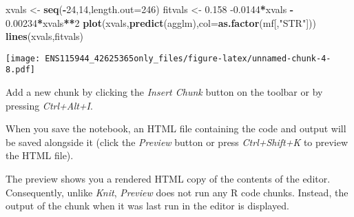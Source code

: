 \documentclass[
]{article}
\newenvironment{Shaded}{\begin{snugshade}}{\end{snugshade}}
\newcommand{\DataTypeTok}[1]{\textcolor[rgb]{0.13,0.29,0.53}{#1}}
\newcommand{\DecValTok}[1]{\textcolor[rgb]{0.00,0.00,0.81}{#1}}
\newcommand{\FloatTok}[1]{\textcolor[rgb]{0.00,0.00,0.81}{#1}}
\newcommand{\KeywordTok}[1]{\textcolor[rgb]{0.13,0.29,0.53}{\textbf{#1}}}
\newcommand{\NormalTok}[1]{#1}
\newcommand{\OperatorTok}[1]{\textcolor[rgb]{0.81,0.36,0.00}{\textbf{#1}}}
\newcommand{\StringTok}[1]{\textcolor[rgb]{0.31,0.60,0.02}{#1}}
\begin{document}
\begin{Shaded}
\begin{Highlighting}[]
\NormalTok{xvals <-}\StringTok{ }\KeywordTok{seq}\NormalTok{(}\OperatorTok{-}\DecValTok{24}\NormalTok{,}\DecValTok{14}\NormalTok{,}\DataTypeTok{length.out=}\DecValTok{246}\NormalTok{)}
\NormalTok{fitvals <-}\StringTok{ }\FloatTok{0.158} \FloatTok{-0.0144}\OperatorTok{*}\NormalTok{xvals }\OperatorTok{-}\StringTok{ }\FloatTok{0.00234}\OperatorTok{*}\NormalTok{xvals}\OperatorTok{**}\DecValTok{2}
\KeywordTok{plot}\NormalTok{(xvals,}\KeywordTok{predict}\NormalTok{(agglm),}\DataTypeTok{col=}\KeywordTok{as.factor}\NormalTok{(mf[,}\StringTok{"STR"}\NormalTok{]))}
\KeywordTok{lines}\NormalTok{(xvals,fitvals)}
\end{Highlighting}
\end{Shaded}

\texttt{[image: ENS115944\_42625365only\_files/figure-latex/unnamed-chunk-4-8.pdf]}

Add a new chunk by clicking the \emph{Insert Chunk} button on the
toolbar or by pressing \emph{Ctrl+Alt+I}.

When you save the notebook, an HTML file containing the code and output
will be saved alongside it (click the \emph{Preview} button or press
\emph{Ctrl+Shift+K} to preview the HTML file).

The preview shows you a rendered HTML copy of the contents of the
editor. Consequently, unlike \emph{Knit}, \emph{Preview} does not run
any R code chunks. Instead, the output of the chunk when it was last run
in the editor is displayed.
\end{document}
